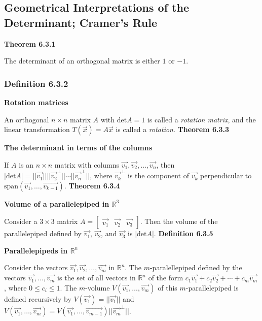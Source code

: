 \subsection{Geometrical Interpretations of the Determinant; Cramer's Rule}
\textbf{Theorem 6.3.1}\\
\par\noindent The determinant of an orthogonal matrix is either $1$ or $-1$.
\subsubsection*{Definition 6.3.2}
\par\noindent\textbf{Rotation matrices}
\par\noindent An orthogonal $n\times{}n$ matrix $A$ with $\textrm{det}A=1$ is called a \textit{rotation matrix}, and the linear transformation $T(\vec{x})=A\vec{x}$ is called a \textit{rotation}.
\textbf{Theorem 6.3.3}\\
\par\noindent\textbf{The determinant in terms of the columns}
\par\noindent If $A$ is an $n\times{}n$ matrix with columns $\vec{v_{1}},\vec{v_{2}},\ldots{},\vec{v_{n}}$, then $|\textrm{det}A|=||\vec{v_{1}}||||\vec{v_{2}}^{\perp}||\cdots{}||\vec{v_{n}}^{\perp}||$, where $\vec{v_{k}}^{\perp}$ is the component of $\vec{v_{k}}$ perpendicular to $\textrm{span}(\vec{v_{1}},\ldots{},\vec{v_{k-1}})$.
\textbf{Theorem 6.3.4}\\
\par\noindent\textbf{Volume of a parallelepiped in $\mathbb{R}^{3}$}
\par\noindent Consider a $3\times{}3$ matrix $A=\left[\begin{array}{ccc}\vec{v_{1}}&\vec{v_{2}}&\vec{v_{3}}\end{array}\right]$. Then the volume of the parallelepiped defined by $\vec{v_{1}}$, $\vec{v_{2}}$, and $\vec{v_{3}}$ is $|\textrm{det}A|$.
\textbf{Definition 6.3.5}\\
\par\noindent\textbf{Parallelepipeds in $\mathbb{R}^{n}$}
\par\noindent Consider the vectors $\vec{v_{1}},\vec{v_{2}},\ldots{},\vec{v_{m}}$ in $\mathbb{R}^{n}$. The $m$-paralellepiped defined by the vectors $\vec{v_{1}},\ldots{},\vec{v_{m}}$ is the set of all vectors in $\mathbb{R}^{n}$ of the form $c_{1}\vec{v_{1}}+c_{2}\vec{v_{2}}+\cdots{}+c_{m}\vec{v_{m}}$, where $0\le{}c_{i}\le{}1$. The $m$-volume $V(\vec{v_{1}},\ldots{},\vec{v_{m}})$ of this $m$-parallelepiped is defined recursively by $V(\vec{v_{1}})=||\vec{v_{1}}||$ and $V(\vec{v_{1}},\ldots{},\vec{v_{m}})=V(\vec{v_{1}},\ldots{},\vec{v_{m-1}})||\vec{v_{m}}^{\perp}||$.
